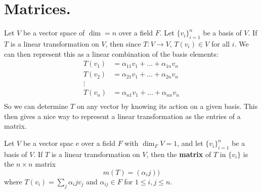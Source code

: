 \section{Matrices.}
\label{section3}

Let $V$ be a vector space of  $\dim=n$ over a field  $F$. Let  $\{v_i\}_{i=1}^n$
be a basis of $V$. If  $T$ is a linear transformation on $V$, then since  $T: V
\rightarrow V$, $T(v_i) \in V$ for all $i$. We can then represent this as a
linear combination of the basis elements:
    \begin{equation*}
        \begin{align*}
            T(v_1)  &=  \alpha_{11}v_1+\dots+\alpha_{1n}v_n \\
            T(v_2)  &=  \alpha_{21}v_1+\dots+\alpha_{2n}v_n \\
                    \vdots                  \\
            T(v_n)  &=  \alpha_{n1}v_1+\dots+\alpha_{nn}v_n \\
        \end{align*}
    \end{equation*}
So we can determine $T$ on any vector by knowing its action on a given basis.
This then gives a nice way to represent a linear transformation as the entries
of a matrix.

\begin{definition}
    Let $V$ be a vector spac e over a field $F$ with  $\dim_F{V}=1$, and let
    $\{v_i\}_{i=1}^n$ be a basis of $V$. If  $T$ is a linear transformation on
    $V$, then the  \textbf{matrix} of $T$ in  $\{v_i\}$ is the $n \times n$
    matrix
        \begin{equation}
            m(T) = (\alpha_ij))
        \end{equation} 
        where $T(v_i)=\sum_j{\alpha_ij}v_j$ and $\alpha_{ij} \in F$ for $1 \leq
        i,j \leq n$.
\end{definition}

